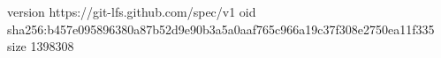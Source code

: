 version https://git-lfs.github.com/spec/v1
oid sha256:b457e095896380a87b52d9e90b3a5a0aaf765c966a19c37f308e2750ea11f335
size 1398308
